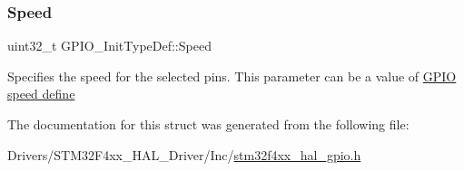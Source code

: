 \subsubsection{\texorpdfstring{Speed}{Speed}}
{\footnotesize\ttfamily uint32\+\_\+t G\+P\+I\+O\+\_\+\+Init\+Type\+Def\+::\+Speed}

Specifies the speed for the selected pins. This parameter can be a value of \hyperlink{group___g_p_i_o__speed__define}{G\+P\+IO speed define} 

The documentation for this struct was generated from the following file\+:\begin{DoxyCompactItemize}
\item 
Drivers/\+S\+T\+M32\+F4xx\+\_\+\+H\+A\+L\+\_\+\+Driver/\+Inc/\hyperlink{stm32f4xx__hal__gpio_8h}{stm32f4xx\+\_\+hal\+\_\+gpio.\+h}\end{DoxyCompactItemize}
